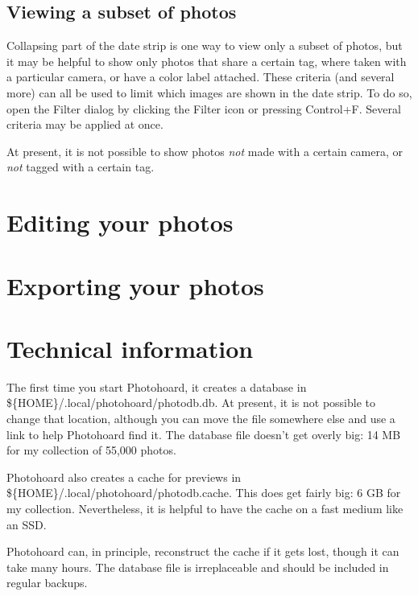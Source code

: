 \documentclass[11pt]{report}
\begin{document}
\section{Viewing a subset of photos}

Collapsing part of the date strip is one way to view only a subset
of photos, but it may be helpful to show only photos that share a
certain tag, where taken with a particular camera, or have a color label
attached. These criteria (and several more) can all be used to limit which
images are shown in the date strip. To do so, open the Filter dialog
by clicking the Filter icon or pressing Control+F. Several criteria
may be applied at once.

At present, it is not possible to
show photos \emph{not} made with a certain camera, or \emph{not}
tagged with a certain tag.

\chapter{Editing your photos}

\chapter{Exporting your photos}


\chapter{Technical information}
The first time you start Photohoard, it creates a database in
\$\{HOME\}/.local/photohoard/photodb.db. At present, it is not possible to change
that location, although you can move the file somewhere else and use a
link to help Photohoard find it. The database file doesn't get overly
big: 14 MB for my collection of 55,000 photos.

Photohoard also creates a cache for previews in
\$\{HOME\}/.local/photohoard/photodb.cache. This does get fairly big:
6 GB for my collection. Nevertheless, it is helpful to have the cache
on a fast medium like an SSD.

Photohoard can, in principle, reconstruct the cache if it gets lost,
though it can take many hours. The database file is irreplaceable
and should be included in regular backups.
\end{document}
